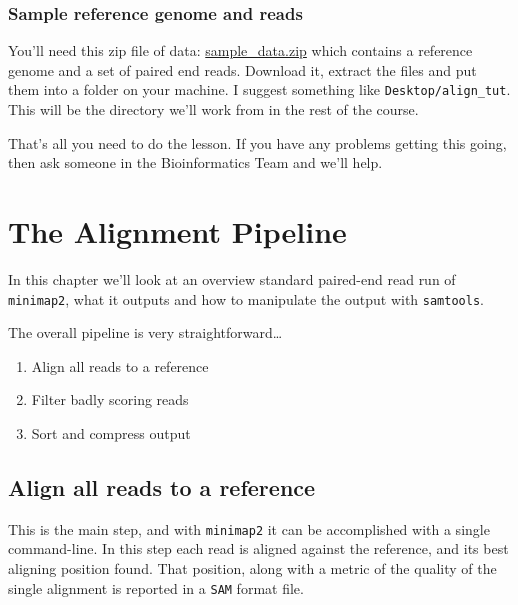 \documentclass[]{book}
\providecommand{\tightlist}{%
  \setlength{\itemsep}{0pt}\setlength{\parskip}{0pt}}
\begin{document}
\hypertarget{sample-reference-genome-and-reads}{%
\subsection{Sample reference genome and reads}\label{sample-reference-genome-and-reads}}

You'll need this zip file of data: \href{https://github.com/TeamMacLean/basic_alignment/raw/master/sample_data/sample_data.zip}{sample\_data.zip} which contains a reference genome and a set of paired end reads. Download it, extract the files and put them into a folder on your machine. I suggest something like \texttt{Desktop/align\_tut}. This will be the directory we'll work from in the rest of the course.

That's all you need to do the lesson. If you have any problems getting this going, then ask someone in the Bioinformatics Team and we'll help.

\hypertarget{intro}{%
\chapter{The Alignment Pipeline}\label{intro}}

In this chapter we'll look at an overview standard paired-end read run of \texttt{minimap2}, what it outputs and how to manipulate the output with \texttt{samtools}.

The overall pipeline is very straightforward\ldots{}

\begin{enumerate}
\def\labelenumi{\arabic{enumi}.}
\tightlist
\item
  Align all reads to a reference
\item
  Filter badly scoring reads
\item
  Sort and compress output
\end{enumerate}

\hypertarget{align-all-reads-to-a-reference}{%
\section{Align all reads to a reference}\label{align-all-reads-to-a-reference}}

This is the main step, and with \texttt{minimap2} it can be accomplished with a single command-line. In this step each read is aligned against the reference, and its best aligning position found. That position, along with a metric of the quality of the single alignment is reported in a \texttt{SAM} format file.
\end{document}
